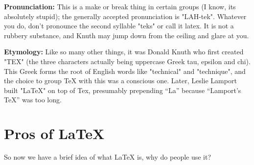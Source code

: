 \documentclass{article}
\begin{document}
\textbf{Pronunciation:} This is a make or break thing in certain groups (I know, its absolutely stupid); the generally accepted pronunciation is "LAH-tek". Whatever you do, don't pronounce the second syllable "teks" or call it latex. It is not a rubbery substance, and Knuth may jump down from the ceiling and glare at you.

\textbf{Etymology:} Like so many other things, it was Donald Knuth who first created "TEX" (the three characters actually being uppercase Greek tau, epsilon and chi). This Greek forms the root of English words like "technical" and "technique", and the choice to group TeX with this was a conscious one. Later, Leslie Lamport built "LaTeX" on top of Tex, presumably prepending “La” because “Lamport’s TeX” was too long.

\section*{Pros of LaTeX}
So now we have a brief idea of what LaTeX is, why do people use it?
\end{document}
